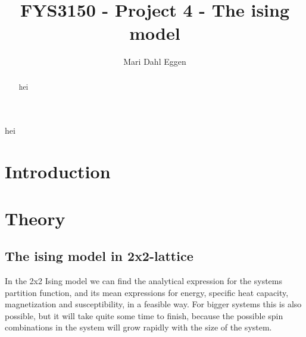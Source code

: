 \documentclass[12pt]{article}
\begin{document}
\title{FYS3150 - Project 4 - The ising model}
\author{Mari Dahl Eggen}
\maketitle

\newpage

\tableofcontents

\begin{flushleft}
\newpage
\begin{abstract}
hei
\end{abstract}
hei
\section{Introduction}
\newpage
\section{Theory}
\subsection{The ising model in 2x2-lattice}
In the 2x2 Ising model  we can find the analytical expression for the systems partition function, and its mean expressions for energy, specific heat capacity, magnetization and susceptibility, in a feasible way. For bigger systems this is also possible, but it will take quite some time to finish, because the possible spin combinations in the system will grow rapidly with the size of the system.  

\end{flushleft}
\end{document}

